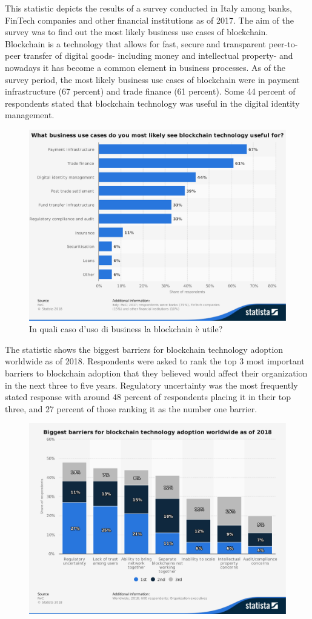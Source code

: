 This statistic depicts the results of a survey conducted in Italy
among banks, FinTech companies and other financial institutions as
of 2017. The aim of the survey was to find out the most likely business
use cases of blockchain. Blockchain is a technology that allows for fast,
secure and transparent peer-to-peer transfer of digital goods-
including money and intellectual property- and nowadays it has
become a common element in business processes. As of the survey period,
the most likely business use cases of blockchain were in payment
infrastructure (67 percent) and trade finance (61 percent).
Some 44 percent of respondents stated that blockchain technology was useful in the digital identity management.
\begin{figure}[H]
	\centering
	\includegraphics[width=.75\linewidth]{images/chap_intro/use-cases-among-businesses.pdf}
	\caption{In quali caso d'uso di business la blockchain è utile?
		\cite{use-cases-among-businesses}}
	\label{fig:use-cases-among-businesses}
\end{figure}


The statistic shows the biggest barriers for blockchain technology adoption
worldwide as of 2018. Respondents were asked to rank the top 3 most important
barriers to blockchain adoption that they believed would affect their organization
in the next three to five years. Regulatory uncertainty was the most frequently
stated response with around 48 percent of
respondents placing it in their top three, and 27 percent of those ranking
it as the number one barrier.

\begin{figure}[H]
	\centering
	\includegraphics[width=.75\linewidth]{images/chap_intro/barriers-worldwide.pdf}
	\caption{
		\cite{barriers-worldwide}}
	\label{fig:barriers-worldwide}
\end{figure}